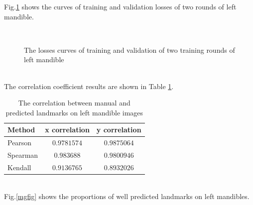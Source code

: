 \documentclass[12pt,a4paper]{article}
\begin{document}
Fig.\ref{lossmgcurves} shows the curves of training and validation losses of two rounds of left mandible.
\begin{figure}[h!]
\centering
{}~~
\caption{The losses curves of training and validation of two training rounds of left mandible  }
\label{lossmgcurves}
\end{figure}~\\[2cm]
The correlation coefficient results are shown in Table \ref{corrmg}.
\begin{table}[h!]
	\centering
	\begin{tabular}{l c c}
		Method & x correlation & y correlation \\ \hline
		Pearson & $0.9781574$ & $0.9875064$ \\ \hline
		Spearman & $0.983688$ & $0.9800946$ \\ \hline
		Kendall & $0.9136765$ & $0.8932026$ \\ \hline
	\end{tabular}
	\caption{The correlation between manual and predicted landmarks on left mandible images}
	\label{corrmg}
\end{table}~\\
Fig.\ref{mgfig} shows the proportions of well predicted landmarks on left mandibles.
\end{document}
